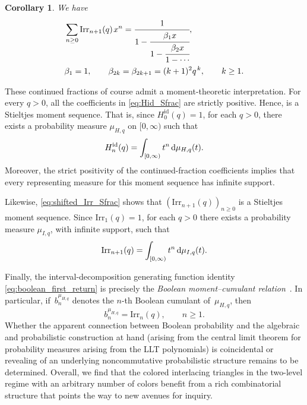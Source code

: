 \documentclass[pdftex]{sigma}
\numberwithin{equation}{section}
\newcommand{\ssp}{\hspace{1pt}}
\newtheorem{Corollary}[Theorem]{Corollary}
\theoremstyle{definition}
\begin{document}
\begin{Corollary}\label{cor:shifted_Irr_Sfrac}
We have
\begin{equation}
\begin{split}
 & \sum_{n\geq0}\mathrm{Irr}_{n+1}(q)\ssp x^n
  =
  \cfrac{1}{1-\cfrac{\beta_1x}
  {1-\cfrac{\beta_2x}
  {1-\cdots}}},
  \\
 & \beta_1=1, \qquad
  \beta_{2k}=\beta_{2k+1}
  =(k+1)^2q^{\ssp k},
  \qquad k\geq1.
\end{split}
  \label{eq:shifted_Irr_Sfrac}
\end{equation}
\end{Corollary}


These continued fractions of course admit a moment-theoretic interpretation. For every $q>0$, all the coefficients in
\eqref{eq:Hid_Sfrac} are strictly positive. Hence, 
is a Stieltjes moment sequence. That is, since $H_0^{\mathrm{id}}(q)=1$, for each $q>0$,
there exists a probability measure $\mu_{H,q}$ on $[0,\infty)$
such that
\[
  H_n^{\mathrm{id}}(q)
  =
  \int_{[0,\infty)}t^n\,{\rm d}\mu_{H,q}(t).
\]
Moreover, the strict positivity of the continued-fraction coefficients implies
that every representing measure for this moment sequence has infinite support.

Likewise, \eqref{eq:shifted_Irr_Sfrac} shows that $(\mathrm{Irr}_{n+1}(q))_{n\geq0}$
is a Stieltjes moment sequence. Since $\mathrm{Irr}_{1}(q)=1$, for each $q>0$ there exists a probability measure $\mu_{I,q}$, with infinite support, such that
 \begin{equation*}
  \mathrm{Irr}_{n+1}(q) =
  \int_{[0,\infty)}t^n\,{\rm d}\mu_{I,q}(t).%
\end{equation*}

Finally, the interval-decomposition generating function identity
\eqref{eq:boolean_first_return} is precisely the \emph{Boolean
moment--cumulant relation}~\cite{SpeicherWoroudi1997}. In particular,
if~$b_n^{\mu_{H,q}}$ denotes the $n$-th Boolean cumulant of~$\mu_{H,q}$, then
\[
  b_n^{\mu_{H,q}}=\mathrm{Irr}_n(q),
  \qquad n\geq1.
\]
Whether the apparent connection between Boolean probability and the algebraic and probabilistic construction at hand (arising from the central limit theorem for probability measures arising from the LLT polynomials) is coincidental or revealing of an underlying noncommutative probabilistic
structure remains to be determined.
Overall, we find that the colored inter\-lacing triangles in the two-level regime with an arbitrary number of
colors benefit from a rich combinatorial structure that points the
way to new avenues for inquiry.
\end{document}
